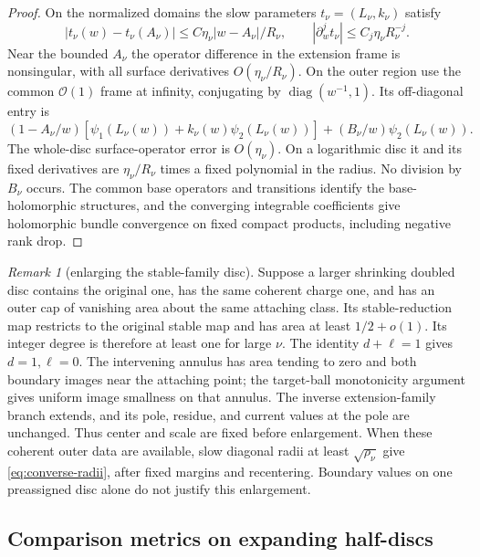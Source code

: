 \documentclass[11pt]{amsart}
\theoremstyle{definition}
\theoremstyle{remark}
\newtheorem{remark}[theorem]{Remark}
\theoremstyle{plain}
\begin{document}
\begin{proof}
On the normalized domains the slow parameters
$t_\nu=(L_\nu,k_\nu)$ satisfy
\begin{equation}\label{eq:converse-divided-parameters}
 |t_\nu(w)-t_\nu(A_\nu)|
       \leq C\eta_\nu|w-A_\nu|/R_\nu,\qquad
 |\partial_w^jt_\nu|\leq C_j\eta_\nu R_\nu^{-j}.
\end{equation}
Near the bounded $A_\nu$ the operator difference in the extension
frame is nonsingular, with all surface derivatives $O(\eta_\nu/R_\nu)$.
On the outer region use the common $\mathcal O(1)$ frame at infinity,
conjugating by $\operatorname{diag}(w^{-1},1)$. Its off-diagonal entry is
\begin{equation}\label{eq:converse-infinity-operator}
 (1-A_\nu/w)[\psi_1(L_\nu(w))+k_\nu(w)\psi_2(L_\nu(w))]
                       +(B_\nu/w)\psi_2(L_\nu(w)).
\end{equation}
The whole-disc surface-operator error is $O(\eta_\nu)$.
On a logarithmic disc it and its fixed derivatives are
$\eta_\nu/R_\nu$ times a fixed polynomial in the radius.
No division by $B_\nu$ occurs. The common base operators and
transitions identify the base-holomorphic structures, and the
converging integrable coefficients give holomorphic bundle
convergence on fixed compact products, including negative rank drop.
\end{proof}

\begin{remark}[enlarging the stable-family disc]
\label{rem:converse-enlargement}
Suppose a larger shrinking doubled disc contains the original one,
has the same coherent charge one, and has an outer cap of vanishing
area about the same attaching class. Its stable-reduction map
restricts to the original stable map and has area at least
$1/2+o(1)$. Its integer degree is therefore at least one for
large $\nu$. The identity $d+\ell=1$ gives $d=1,\ell=0$.
The intervening annulus has area tending to zero and both boundary
images near the attaching point; the target-ball monotonicity
argument gives uniform image smallness on that annulus.
The inverse extension-family branch extends, and its pole,
residue, and current values at the pole are unchanged.
Thus center and scale are fixed before enlargement. When these
coherent outer data are available, slow diagonal radii at least
$\sqrt{\rho_\nu}$ give \eqref{eq:converse-radii}, after fixed
margins and recentering. Boundary values on one preassigned disc
alone do not justify this enlargement.
\end{remark}

\subsection{Comparison metrics on expanding half-discs}
\end{document}
